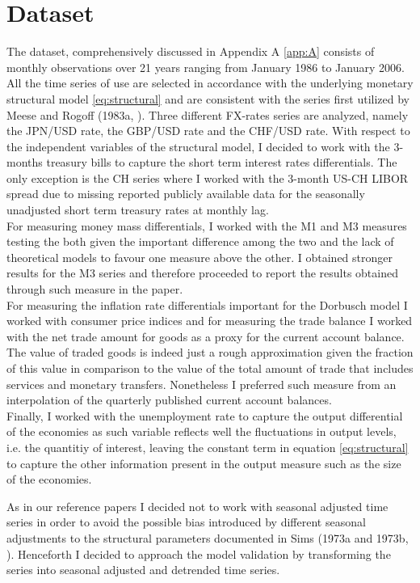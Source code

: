 \section{Dataset} \label{sec:dataset}

The dataset, comprehensively discussed in Appendix A \ref{app:A}
consists of monthly observations over 21 years ranging from January
1986 to January 2006.  All the time series of use are selected in
accordance with the underlying monetary structural model
\ref{eq:structural} and are consistent with the series first utilized
by Meese and Rogoff (1983a, \cite{MeeseRogoffa}). Three different
FX-rates series are analyzed, namely the JPN/USD rate, the GBP/USD
rate and the CHF/USD rate.  With respect to the independent variables
of the structural model, I decided to work with the 3-months treasury
bills to capture the short term interest rates differentials. The only
exception is the CH series where I worked with the 3-month US-CH LIBOR
spread due to missing reported publicly available data for the
seasonally unadjusted short term treasury rates at monthly lag.  \\
For measuring money mass differentials, I worked with the M1 and M3
measures testing the both given the important difference among the two
and the lack of theoretical models to favour one measure above the
other. I obtained stronger results for the M3 series and therefore
proceeded to report the results obtained through such measure in the
paper. \\ For measuring the inflation rate differentials important for
the Dorbusch model I worked with consumer price indices and for
measuring the trade balance I worked with the net trade amount for
goods as a proxy for the current account balance.  The value of traded
goods is indeed just a rough approximation given the fraction of this
value in comparison to the value of the total amount of trade that
includes services and monetary transfers. Nonetheless I preferred such
measure
from an interpolation of the quarterly published current account balances. \\
Finally, I worked with the unemployment rate to capture the output
differential of the economies as such variable reflects well the
fluctuations in output levels, i.e. the quantitiy of interest, leaving
the constant term in equation \ref{eq:structural} to capture the other
information present in the output measure such as the size of the
economies.

As in our reference papers I decided not to work with seasonal
adjusted time series in order to avoid the possible bias introduced by
different seasonal adjustments to the structural parameters documented
in Sims (1973a and 1973b, \cite{Simsa, Simsb}).  Henceforth I decided
to approach the model validation by transforming the series into
seasonal adjusted and detrended time series.

